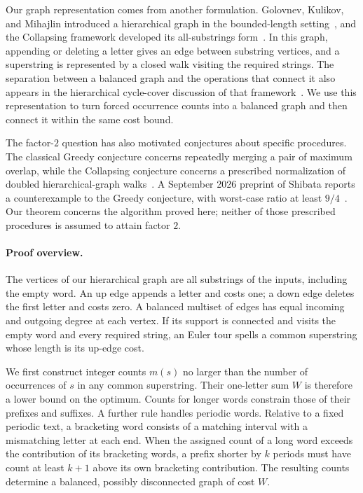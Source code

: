 Our graph representation comes from another formulation. Golovnev, Kulikov, and Mihajlin introduced a hierarchical graph in the bounded-length setting~\cite{golovnev2014}, and the Collapsing framework developed its all-substrings form~\cite{collapsing2020}. In this graph, appending or deleting a letter gives an edge between substring vertices, and a superstring is represented by a closed walk visiting the required strings. The separation between a balanced graph and the operations that connect it also appears in the hierarchical cycle-cover discussion of that framework~\cite[revised version, Section~7.2]{collapsing2020}. We use this representation to turn forced occurrence counts into a balanced graph and then connect it within the same cost bound.

The factor-$2$ question has also motivated conjectures about specific procedures. The classical Greedy conjecture concerns repeatedly merging a pair of maximum overlap, while the Collapsing conjecture concerns a prescribed normalization of doubled hierarchical-graph walks~\cite{collapsing2020}. A September 2026 preprint of Shibata reports a counterexample to the Greedy conjecture, with worst-case ratio at least $9/4$~\cite{greedy2026}. Our theorem concerns the algorithm proved here; neither of those prescribed procedures is assumed to attain factor $2$.

\paragraph{Proof overview.}
The vertices of our hierarchical graph are all substrings of the inputs, including the empty word. An up edge appends a letter and costs one; a down edge deletes the first letter and costs zero. A balanced multiset of edges has equal incoming and outgoing degree at each vertex. If its support is connected and visits the empty word and every required string, an Euler tour spells a common superstring whose length is its up-edge cost.

We first construct integer counts $m(s)$ no larger than the number of occurrences of $s$ in any common superstring. Their one-letter sum $W$ is therefore a lower bound on the optimum. Counts for longer words constrain those of their prefixes and suffixes. A further rule handles periodic words. Relative to a fixed periodic text, a bracketing word consists of a matching interval with a mismatching letter at each end. When the assigned count of a long word exceeds the contribution of its bracketing words, a prefix shorter by $k$ periods must have count at least $k+1$ above its own bracketing contribution. The resulting counts determine a balanced, possibly disconnected graph of cost $W$.


